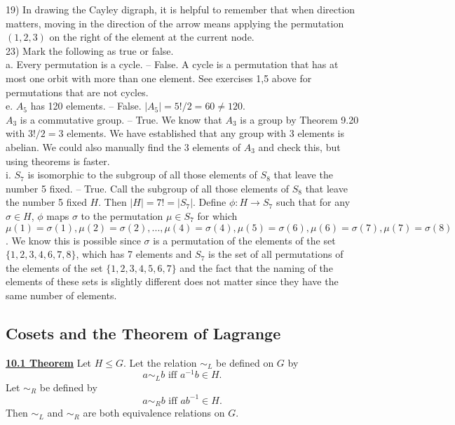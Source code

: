 \documentclass[12pt, letterpaper]{article}
\begin{document}
19) In drawing the Cayley digraph, it is helpful to remember that when direction matters, moving in the direction of the arrow means applying the permutation $(1,2,3)$ on the right of the element at the current node. \\

23) Mark the following as true or false. \\

a. Every permutation is a cycle. -- False. A cycle is a permutation that has at most one orbit with more than one element. See exercises 1,5 above for permutations that are not cycles. \\

e. $A_5$ has 120 elements. -- False. $|A_5| = 5! / 2 = 60 \neq 120$. \\

$A_3$ is a commutative group. -- True. We know that $A_3$ is a group by Theorem 9.20 with $3!/2 = 3$ elements. We have established that any group with 3 elements is abelian. We could also manually find the 3 elements of $A_3$ and check this, but using theorems is faster. \\

i. $S_7$ is isomorphic to the subgroup of all those elements of $S_8$ that leave the number 5 fixed. -- True. Call the subgroup of all those elements of $S_8$ that leave the number 5 fixed $H$. Then $|H| = 7! = |S_7|$. Define $\phi : H \rightarrow S_7$ such that for any $\sigma \in H$, $\phi$ maps $\sigma$ to the permutation $\mu \in S_7$ for which $\mu(1) = \sigma(1), \mu(2) = \sigma(2),..., \mu(4) = \sigma(4),\mu(5) = \sigma(6), \mu(6) = \sigma(7), \mu(7) = \sigma(8)$. We know this is possible since $\sigma$ is a permutation of the elements of the set $\{1,2,3,4,6,7,8\}$, which has 7 elements and $S_7$ is the set of all permutations of the elements of the set $\{1,2,3,4,5,6,7\}$ and the fact that the naming of the elements of these sets is slightly different does not matter since they have the same number of elements.  \\

\subsection{Cosets and the Theorem of Lagrange}

\noindent \underline{\bf 10.1 Theorem} Let $H \leq G$. Let the relation $\sim_L$ be defined on $G$ by $$a \sim_L b \mbox{   iff   } a^{-1}b \in H.$$ Let $\sim_R$ be defined by $$a \sim_R b \mbox{   iff   } ab^{-1} \in H.$$ Then $\sim_L$ and $\sim_R$ are both equivalence relations on $G$. \\
\end{document}
